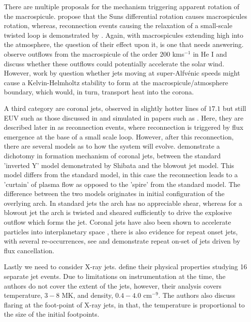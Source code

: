 \documentclass{emulateapj}
\begin{document}
There are multiple proposals for the mechanism triggering apparent rotation of the macrospicule. 
\cite{Curdt2011} propose that the Suns differential rotation causes macrospicules rotation, whereas, reconnection events causing the relaxation of a small-scale twisted loop is demonstrated by \cite{Adams2014}.
Again, with macrospicules extending high into the atmosphere, the question of their effect upon it, is one that needs answering.
\cite{Pike_Harrison1997} observe outflows from the macrospicule of the order $200$ kms$^{-1}$ in He I and discuss whether these outflows could potentially accelerate the solar wind.
However, work by \cite{Zaqarashvili2014} question whether jets moving at super-Alfv{\'e}nic speeds might cause a Kelvin-Helmholtz stability to form at the macrospicule/atmosphere boundary, which would, in turn, transport heat into the corona.

A third  category are coronal jets, observed in slightly hotter lines of $17.1$ but still EUV such as those discussed in \cite{Shibata1992} and simulated in papers such as \cite{Wyper2016}.
Here, they are described later in \cite{Shibata1994} as reconnection events, where reconnection is triggered by flux emergence at the base of a small scale loop.
However, after this reconnection, there are several models as to how the system will evolve.
\cite{Moore2010} demonstrate a dichotomy in formation mechanism of coronal jets, between the standard 'inverted Y' model demonstrated by Shibata and the blowout jet model. 
This model differs from the standard model, in this case the reconnection leads to a 'curtain' of plasma flow as opposed to the 'spire' from the standard model.
The difference between the two models originates in initial configuration of the overlying arch. 
In standard jets the arch has no appreciable shear, whereas for a blowout jet the arch is twisted and sheared sufficiently to drive the explosive outflow which forms the jet.
Coronal jets have also been shown to accelerate particles into interplanetary space \citep{Li2011}, there is also evidence for repeat onset jets, with several re-occurrences, see \cite{Li2011} and \cite{Chifor2008} demonstrate repeat on-set of jets driven by flux cancellation.

Lastly we need to consider X-ray jets.
\cite{Shimojo2000} define their physical properties studying 16 separate jet events.
Due to limitations on instrumentation at the time, the authors do not cover the extent of the jets, however, their analysis covers temperature, $3 - 8$ MK, and density, $0.4 - 4.0$ cm$^{-9}$.
The authors also discuss flaring at the foot-point of X-ray jets, in that, the temperature is proportional to the size of the initial footpoints.
\end{document}
